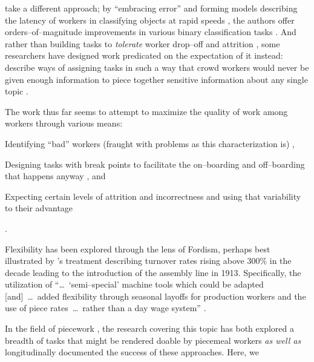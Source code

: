\documentclass[trackingWork]{subfiles}
\begin{document}
{    \citeauthor{embracingErrorKrishna} take a different approach;
    by ``embracing error'' and forming models describing the latency of workers in classifying objects at rapid speeds%
,     the authors offer orders--of--magnitude improvements
    in various binary classification tasks
    \cite{embracingErrorKrishna}.
    And rather than building tasks to \textit{tolerate} worker drop--off and attrition%
,     some researchers have designed work predicated on the expectation of it instead:
    \citeauthor{sensitiveTasks} describe ways of assigning tasks in such a way that
    crowd workers would never be given enough information to piece together sensitive information about
    any single topic
    \cite{sensitiveTasks}.

    The work thus far seems to attempt to maximize the quality of work among workers through various means:
    \begin{inlinelist}
      \item Identifying ``bad'' workers (fraught with problems as this characterization is) \cite{MaliciouscrowdworkersGadiraju}%
,       \item Designing tasks with break points to facilitate the on--boarding and off--boarding that happens anyway \cite{cheng2015break}, and
      \item Expecting certain levels of attrition and incorrectness and using that variability to their advantage \cite{embracingErrorKrishna}
    \end{inlinelist}.


    Flexibility has been explored through the lens of Fordism, perhaps best illustrated by
    \citeauthor{tolliday1986between}'s treatment describing
    turnover rates rising above 300\% in the decade leading to the introduction of the assembly line in 1913.
    Specifically, the utilization of ``\dots~`semi--special' machine tools which could be adapted
    [and]~\dots~added flexibility through seasonal layoffs for production workers and the use of
    piece rates~\dots~rather than a day wage system''
    \cite{tolliday1986between}.

    In the field of piecework%
,     the research covering this topic has both explored
    a breadth of tasks that might be rendered doable by piecemeal workers
    \textit{as well as} longitudinally documented the success of these approaches.
    Here, we 
}
\end{document}
